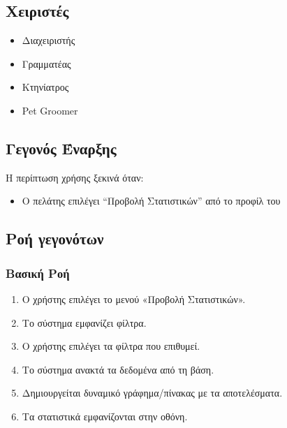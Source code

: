 \documentclass[12pt,a4paper,twoside]{book}
\begin{document}
\subsection{Χειριστές}
\begin{itemize}
  \item Διαχειριστής
  \item Γραμματέας
  \item Κτηνίατρος
  \item Pet Groomer
\end{itemize}

\subsection{Γεγονός Έναρξης}
Η περίπτωση χρήσης ξεκινά όταν:
\begin{itemize}
  \item Ο πελάτης επιλέγει “Προβολή Στατιστικών” από το προφίλ του   %
\end{itemize}

\subsection{Ροή γεγονότων}

\subsubsection{Βασική Ροή}
\begin{enumerate}
  \item Ο χρήστης επιλέγει το μενού «Προβολή Στατιστικών».  %
  \item Το σύστημα εμφανίζει φίλτρα. %
  \item Ο χρήστης επιλέγει τα φίλτρα που επιθυμεί.   %
  \item Το σύστημα ανακτά τα δεδομένα από τη βάση.  %
  \item Δημιουργείται δυναμικό γράφημα/πίνακας με τα αποτελέσματα.  %
  \item Τα στατιστικά εμφανίζονται στην οθόνη. %
\end{enumerate}
\end{document}
